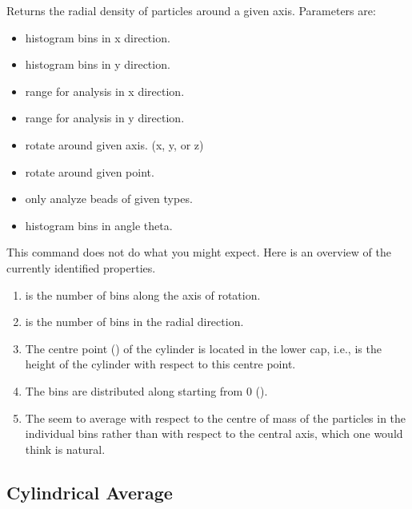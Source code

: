 Returns the radial density of particles around a given
axis. Parameters are:
\begin{itemize}
\item {} histogram bins in x direction.
\item {} histogram bins in y direction.
\item {} range for analysis in x direction.
\item {} range for analysis in y direction.
\item {} rotate around given axis. (x, y, or z)
\item {} rotate around given point.
\item {} only analyze beads of given types.
\item {} histogram bins in angle theta.
\end{itemize}


This command does not do what you might expect.  Here is an overview
of the currently identified properties.
\begin{enumerate}
\item {} is the number of bins along the axis of rotation.
\item {} is the number of bins in the radial direction.
\item The centre point () of the cylinder is
  located in the lower cap, i.e.,  is the height of the
  cylinder with respect to this centre point.
\item The bins are distributed along  starting
  from 0 ().
\item The  seem to average with respect to the centre
  of mass of the particles in the individual bins rather than with
  respect to the central axis, which one would think is natural.
\end{enumerate}

\subsection{Cylindrical Average}
\label{analyze:cylindricalaverage}

\begin{pysyntax}
\end{pysyntax}

